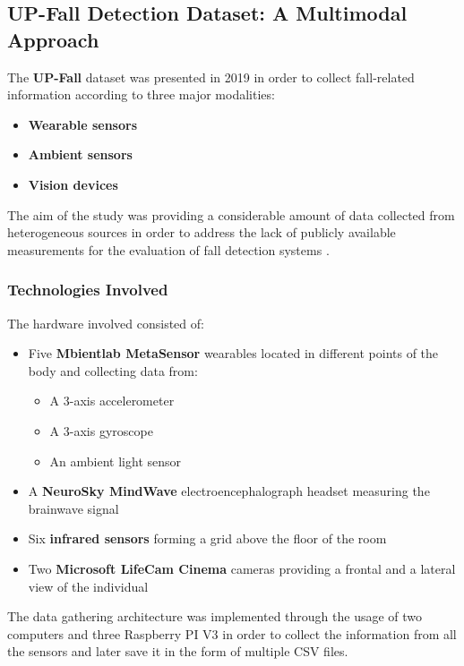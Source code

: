 \subsection{UP-Fall Detection Dataset: A Multimodal Approach}\label{sec:upfall}

The \textbf{UP-Fall} dataset was presented in 2019 in order to collect fall-related information according to three major modalities:

\begin{itemize}
    \item \textbf{Wearable sensors}
    \item \textbf{Ambient sensors}
    \item \textbf{Vision devices}
\end{itemize}

The aim of the study was providing a considerable amount of data collected from heterogeneous sources in order to address the lack of publicly available measurements for the evaluation of fall detection systems \cite{upfall}.

\subsubsection{Technologies Involved}\label{subsubsec:upfall-technologies}

The hardware involved consisted of: 

\begin{itemize}
\item Five \textbf{Mbientlab MetaSensor} wearables located in different points of the body and collecting data from: 
    \begin{itemize}
        \item A 3-axis accelerometer
        \item A 3-axis gyroscope
        \item An ambient light sensor
    \end{itemize}
\item A \textbf{NeuroSky MindWave} electroencephalograph headset measuring the brainwave signal
\item Six \textbf{infrared sensors} forming a grid above the floor of the room
\item Two \textbf{Microsoft LifeCam Cinema} cameras providing a frontal and a lateral view of the individual 
\end{itemize}

The data gathering architecture was implemented through the usage of two computers and three Raspberry PI V3 in order to collect the information from all the sensors and later save it in the form of multiple CSV files.

